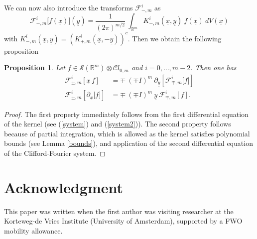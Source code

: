 \documentclass{amsart}
\newtheorem{proposition}[theorem]{Proposition}
\theoremstyle{remark}
\begin{document}
We can now also introduce the transforms $\mathcal{F}^{i}_{-,m}$ as
\[
\mathcal{F}^{i}_{-,m} \lbrack f({\underline{x}}) \rbrack ({\underline{y}}) =  \frac{1}{(2 \pi)^{m/2}} \ \int_{\mathbb{R}^m} K^{i}_{-,m}({\underline{x}},{\underline{y}}) \ f({\underline{x}}) \ dV({\underline{x}})
\]
with $K^{i}_{-,m}({\underline{x}},{\underline{y}}) = \left( K^{i}_{+,m}({\underline{x}},-{\underline{y}}) \right)^c$. Then we obtain the following proposition
\begin{proposition} \label{DiffTransform}
Let $f \in {\mathcal{S}}({\mathbb{R}}^{m})\otimes {\mathcal{C}} l_{0,m}$ and $i=0,\ldots,m-2$. Then one has
\begin{align*}
{\mathcal{F}}_{\pm,m}^i \left\lbrack {\underline{x}} \, f \right\rbrack & = \mp \ (\mp I)^m \  {\partial_{\underline{y}}} \left\lbrack {\mathcal{F}}_{\mp,m}^i \lbrack  f \rbrack \right\rbrack\\
{\mathcal{F}}_{\pm,m}^i \left\lbrack {\partial_{\underline{x}}} \lbrack f \rbrack  \right\rbrack & = \mp  \ (\mp I)^m \ {\underline{y}} \ {\mathcal{F}}_{\mp,m}^i \left\lbrack f \right\rbrack.
\end{align*} 
\end{proposition}
\begin{proof}
The first property immediately follows from the first differential equation of the kernel (see (\ref{system}) and (\ref{system2})). The second property follows because of partial integration, which is allowed as the kernel satisfies polynomial bounds (see Lemma \ref{bounds}), and application of the second differential equation of the Clifford-Fourier system.
\end{proof}

\section*{Acknowledgment}

This paper was written when the first author was visiting researcher at the Korteweg-de Vries Institute (University of Amsterdam), supported by a FWO mobility allowance.
\end{document}
